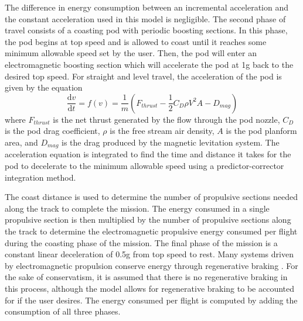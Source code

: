 	The difference in energy consumption between an incremental acceleration
	and the constant acceleration used in this model is negligible.
	The second phase of travel consists of a coasting pod with periodic boosting sections.
	In this phase, the pod begins at top speed and is allowed to coast until it
	reaches some minimum allowable speed set by the user.
	Then, the pod will enter an electromagnetic boosting section which will
	accelerate the pod at 1g back to the desired top speed.
	For straight and level travel, the acceleration of the pod is given by the equation
	\begin{equation}
		\label{eq:acceleration}
		\frac{\mathrm{d} v}{\mathrm{d} t} = f ( v  ) = \frac{1}{m} ( F_{thrust} - \frac{1}{2}C_{D}\rho V^{2}A - D_{mag})
	\end{equation}
	where $F_{thrust}$ is the net thrust generated by the flow through the pod
	nozzle, $C_D$ is the pod drag coefficient, $\rho$ is the free stream air
	density, $A$ is the pod planform area, and $D_{mag}$ is the drag produced
	by the magnetic levitation system. The acceleration equation is integrated
	to find the time and distance it takes for the pod to decelerate to the
	minimum allowable speed using a predictor-corrector integration method.

  The coast distance is used to determine the number of propulsive sections
	needed along the track to complete the mission. The energy consumed in a
	single propulsive section is then multiplied by the number of propulsive
	sections along the track to determine the electromagnetic propulsive energy
	consumed per flight during the coasting phase of the mission. The final
	phase of the mission is a constant linear deceleration of 0.5g from top
	speed to rest. Many systems driven by electromagnetic propulsion conserve
	energy through regenerative braking \cite{inductrack}. For the sake of
	conservatism, it is assumed that there is no regenerative braking in this
	process, although the model allows for regenerative braking to be
	accounted for if the user desires. The energy consumed per flight is
	computed by adding the consumption of all three phases.

